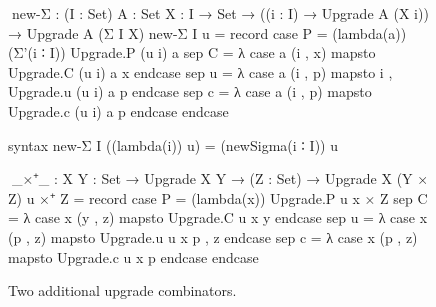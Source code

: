 \begin{figure}
\codefigure
\begin{code}
^^^new-Σ :  (I : Set) {A : Set} {X : I → Set} →
            ((i : I) → Upgrade A (X i)) → Upgrade A (Σ I X)
new-Σ I u = record  case  P  = (lambda(a)) (Σ'(i ∶ I)) Upgrade.P (u i) a
                    sep   C  = λ case a (i , x) mapsto Upgrade.C (u i) a x      endcase
                    sep   u  = λ case a (i , p) mapsto i , Upgrade.u (u i) a p  endcase
                    sep   c  = λ case a (i , p) mapsto Upgrade.c (u i) a p      endcase endcase

syntax new-Σ I ((lambda(i)) u) = (newSigma(i ∶ I)) u

^^^_×⁺_ : {X Y : Set} → Upgrade X Y → (Z : Set) → Upgrade X (Y × Z)
u ×⁺ Z = record  case  P  = (lambda(x)) Upgrade.P u x × Z
                 sep   C  = λ case x (y , z) mapsto Upgrade.C u x y      endcase
                 sep   u  = λ case x (p , z) mapsto Upgrade.u u x p , z  endcase
                 sep   c  = λ case x (p , z) mapsto Upgrade.c u x p      endcase endcase
\end{code}
\caption{Two additional upgrade combinators.}
\label{fig:fusion-upgrade-combinators}
\end{figure}


